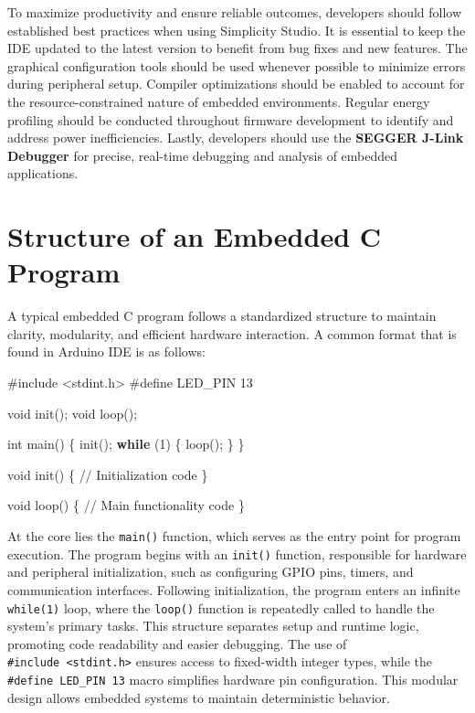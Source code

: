 \documentclass[
  9pt,
  letterpaper,
  abstract,
  titlepage]{scrbook}
\newenvironment{Shaded}{\begin{snugshade}}{\end{snugshade}}
\newcommand{\CommentTok}[1]{\textcolor[rgb]{0.37,0.37,0.37}{#1}}
\newcommand{\ControlFlowTok}[1]{\textcolor[rgb]{0.00,0.23,0.31}{\textbf{#1}}}
\newcommand{\DataTypeTok}[1]{\textcolor[rgb]{0.68,0.00,0.00}{#1}}
\newcommand{\DecValTok}[1]{\textcolor[rgb]{0.68,0.00,0.00}{#1}}
\newcommand{\ImportTok}[1]{\textcolor[rgb]{0.00,0.46,0.62}{#1}}
\newcommand{\NormalTok}[1]{\textcolor[rgb]{0.00,0.23,0.31}{#1}}
\newcommand{\OperatorTok}[1]{\textcolor[rgb]{0.37,0.37,0.37}{#1}}
\newcommand{\PreprocessorTok}[1]{\textcolor[rgb]{0.68,0.00,0.00}{#1}}
\begin{document}
To maximize productivity and ensure reliable outcomes, developers should
follow established best practices when using Simplicity Studio. It is
essential to keep the IDE updated to the latest version to benefit from
bug fixes and new features. The graphical configuration tools should be
used whenever possible to minimize errors during peripheral setup.
Compiler optimizations should be enabled to account for the
resource-constrained nature of embedded environments. Regular energy
profiling should be conducted throughout firmware development to
identify and address power inefficiencies. Lastly, developers should use
the \textbf{SEGGER J-Link Debugger} for precise, real-time debugging and
analysis of embedded applications.

\section{Structure of an Embedded C
Program}\label{structure-of-an-embedded-c-program}

A typical embedded C program follows a standardized structure to
maintain clarity, modularity, and efficient hardware interaction. A
common format that is found in Arduino IDE is as follows:

\begin{Shaded}
\begin{Highlighting}[]
\PreprocessorTok{\#include }\ImportTok{\textless{}stdint.h\textgreater{}}
\PreprocessorTok{\#define LED\_PIN }\DecValTok{13}

\DataTypeTok{void}\NormalTok{ init}\OperatorTok{();}
\DataTypeTok{void}\NormalTok{ loop}\OperatorTok{();}

\DataTypeTok{int}\NormalTok{ main}\OperatorTok{()} \OperatorTok{\{}
\NormalTok{    init}\OperatorTok{();}
    \ControlFlowTok{while} \OperatorTok{(}\DecValTok{1}\OperatorTok{)} \OperatorTok{\{}
\NormalTok{        loop}\OperatorTok{();}
    \OperatorTok{\}}
\OperatorTok{\}}

\DataTypeTok{void}\NormalTok{ init}\OperatorTok{()} \OperatorTok{\{}
    \CommentTok{// Initialization code}
\OperatorTok{\}}

\DataTypeTok{void}\NormalTok{ loop}\OperatorTok{()} \OperatorTok{\{}
    \CommentTok{// Main functionality code}
\OperatorTok{\}}
\end{Highlighting}
\end{Shaded}

At the core lies the \texttt{main()} function, which serves as the entry
point for program execution. The program begins with an \texttt{init()}
function, responsible for hardware and peripheral initialization, such
as configuring GPIO pins, timers, and communication interfaces.
Following initialization, the program enters an infinite
\texttt{while(1)} loop, where the \texttt{loop()} function is repeatedly
called to handle the system's primary tasks. This structure separates
setup and runtime logic, promoting code readability and easier
debugging. The use of
\texttt{\#include\ \textless{}stdint.h\textgreater{}} ensures access to
fixed-width integer types, while the \texttt{\#define\ LED\_PIN\ 13}
macro simplifies hardware pin configuration. This modular design allows
embedded systems to maintain deterministic behavior.
\end{document}
